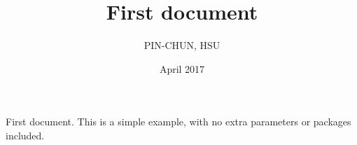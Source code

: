 \documentclass[12pt, a4paper]{article}
\title{First document}
\author{PIN-CHUN, HSU}
\date{April 2017}
\begin{document}
\maketitle

First document. This is a simple example, with no
extra parameters or packages included.
\end{document}
